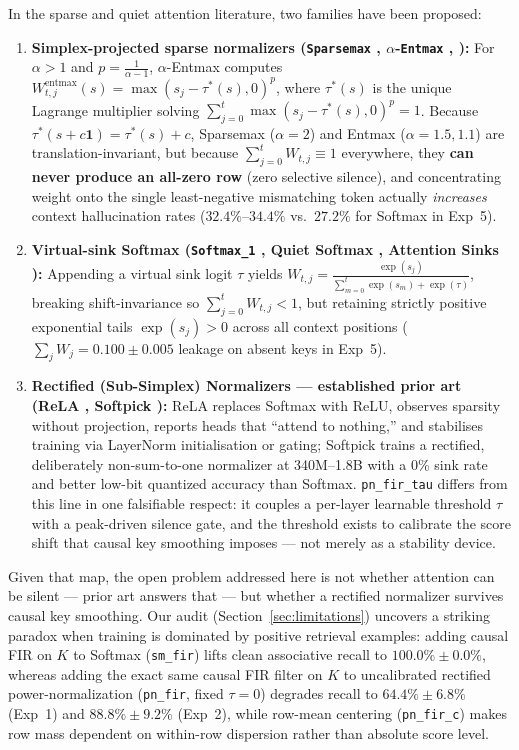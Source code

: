 \documentclass[11pt,a4paper]{article}
\begin{document}
In the sparse and quiet attention literature, two families have been proposed:
\begin{enumerate}
\item \textbf{Simplex-projected sparse normalizers (\texttt{Sparsemax} \cite{martins2016sparsemax}, $\alpha$-\texttt{Entmax} \cite{peters2019sparse}, \cite{correia2019adaptively}):} For $\alpha > 1$ and $p = \frac{1}{\alpha-1}$, $\alpha$-Entmax computes $W_{t,j}^{\text{entmax}}(s) = \max(s_j - \tau^*(s), 0)^p$, where $\tau^*(s)$ is the unique Lagrange multiplier solving $\sum_{j=0}^{t} \max(s_j - \tau^*(s), 0)^p = 1$. Because $\tau^*(s + c\mathbf{1}) = \tau^*(s) + c$, Sparsemax ($\alpha=2$) and Entmax ($\alpha=1.5, 1.1$) are translation-invariant, but because $\sum_{j=0}^{t} W_{t,j} \equiv 1$ everywhere, they \textbf{can never produce an all-zero row} (zero selective silence), and concentrating weight onto the single least-negative mismatching token actually \emph{increases} context hallucination rates ($32.4\%\text{--}34.4\%$ vs.\ $27.2\%$ for Softmax in Exp~5).
\item \textbf{Virtual-sink Softmax (\texttt{Softmax\_1} \cite{miller2023offbyone}, Quiet Softmax \cite{bondarenko2023quantizable}, Attention Sinks \cite{xiao2024streamingllm}):} Appending a virtual sink logit $\tau$ yields $W_{t,j} = \frac{\exp(s_j)}{\sum_{m=0}^t \exp(s_m) + \exp(\tau)}$, breaking shift-invariance so $\sum_{j=0}^t W_{t,j} < 1$, but retaining strictly positive exponential tails $\exp(s_j) > 0$ across all context positions ($\sum_j W_j = 0.100 \pm 0.005$ leakage on absent keys in Exp~5).
\item \textbf{Rectified (Sub-Simplex) Normalizers --- established prior art (ReLA \cite{zhang2021rela}, Softpick \cite{zuhri2025softpick}):} ReLA \cite{zhang2021rela} replaces Softmax with ReLU, observes sparsity without projection, reports heads that ``attend to nothing,'' and stabilises training via LayerNorm initialisation or gating; Softpick \cite{zuhri2025softpick} trains a rectified, deliberately non-sum-to-one normalizer at 340M--1.8B with a 0\% sink rate and better low-bit quantized accuracy than Softmax. \texttt{pn\_fir\_tau} differs from this line in one falsifiable respect: it couples a per-layer learnable threshold $\tau$ with a peak-driven silence gate, and the threshold exists to calibrate the score shift that causal key smoothing imposes --- not merely as a stability device.
\end{enumerate}

Given that map, the open problem addressed here is not whether attention can be silent --- prior art answers that --- but whether a rectified normalizer survives causal key smoothing. Our audit (Section~\ref{sec:limitations}) uncovers a striking paradox when training is dominated by positive retrieval examples: adding causal FIR on $K$ to Softmax (\texttt{sm\_fir}) lifts clean associative recall to $100.0\% \pm 0.0\%$, whereas adding the exact same causal FIR filter on $K$ to uncalibrated rectified power-normalization (\texttt{pn\_fir}, fixed $\tau=0$) degrades recall to $64.4\% \pm 6.8\%$ (Exp~1) and $88.8\% \pm 9.2\%$ (Exp~2), while row-mean centering (\texttt{pn\_fir\_c}) makes row mass dependent on within-row dispersion rather than absolute score level.
\end{document}
